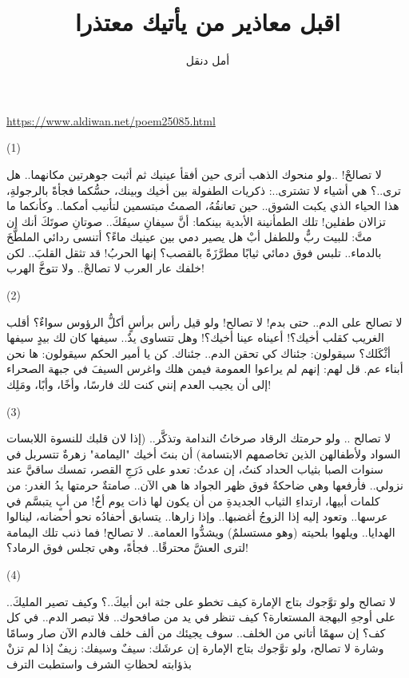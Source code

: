 \documentclass{article}
\title{اقبل معاذير من يأتيك معتذرا}
\author{\textarabic{أمل دنقل}}
\date{}
\begin{document}
\centering

\maketitle

\textenglish{\href{https://www.aldiwan.net/poem25085.html}{https://www.aldiwan.net/poem25085.html}}

\begin{modernpoem*}
(1)

لا تصالحْ!
..ولو منحوك الذهب
أترى حين أفقأ عينيك
ثم أثبت جوهرتين مكانهما..
هل ترى..؟
هي أشياء لا تشترى..:
ذكريات الطفولة بين أخيك وبينك،
حسُّكما فجأةً بالرجولةِ،
هذا الحياء الذي يكبت الشوق.. حين تعانقُهُ،
الصمتُ مبتسمين لتأنيب أمكما.. وكأنكما
ما تزالان طفلين!
تلك الطمأنينة الأبدية بينكما:
أنَّ سيفانِ سيفَكَ..
صوتانِ صوتَكَ
أنك إن متَّ:
للبيت ربٌّ
وللطفل أبْ
هل يصير دمي بين عينيك ماءً؟
أتنسى ردائي الملطَّخَ بالدماء..
تلبس فوق دمائي ثيابًا مطرَّزَةً بالقصب؟
إنها الحربُ!
قد تثقل القلبَ..
لكن خلفك عار العرب
لا تصالحْ..
ولا تتوخَّ الهرب!

(2)

لا تصالح على الدم.. حتى بدم!
لا تصالح! ولو قيل رأس برأسٍ
أكلُّ الرؤوس سواءٌ؟
أقلب الغريب كقلب أخيك؟!
أعيناه عينا أخيك؟!
وهل تتساوى يدٌ.. سيفها كان لك
بيدٍ سيفها أثْكَلك؟
سيقولون:
جئناك كي تحقن الدم..
جئناك. كن يا أمير الحكم
سيقولون:
ها نحن أبناء عم.
قل لهم: إنهم لم يراعوا العمومة فيمن هلك
واغرس السيفَ في جبهة الصحراء
إلى أن يجيب العدم
إنني كنت لك
فارسًا،
وأخًا،
وأبًا،
ومَلِك!

(3)

لا تصالح ..
ولو حرمتك الرقاد
صرخاتُ الندامة
وتذكَّر..
(إذا لان قلبك للنسوة اللابسات السواد ولأطفالهن الذين تخاصمهم الابتسامة)
أن بنتَ أخيك "اليمامة"
زهرةٌ تتسربل في سنوات الصبا
بثياب الحداد
كنتُ، إن عدتُ:
تعدو على دَرَجِ القصر،
تمسك ساقيَّ عند نزولي..
فأرفعها وهي ضاحكةٌ
فوق ظهر الجواد
ها هي الآن.. صامتةٌ
حرمتها يدُ الغدر:
من كلمات أبيها،
ارتداءِ الثياب الجديدةِ
من أن يكون لها ذات يوم أخٌ!
من أبٍ يتبسَّم في عرسها..
وتعود إليه إذا الزوجُ أغضبها..
وإذا زارها.. يتسابق أحفادُه نحو أحضانه،
لينالوا الهدايا..
ويلهوا بلحيته (وهو مستسلمٌ)
ويشدُّوا العمامة..
لا تصالح!
فما ذنب تلك اليمامة
لترى العشَّ محترقًا.. فجأةً،
وهي تجلس فوق الرماد؟!

(4)

لا تصالح
ولو توَّجوك بتاج الإمارة
كيف تخطو على جثة ابن أبيكَ..؟
وكيف تصير المليكَ..
على أوجهِ البهجة المستعارة؟
كيف تنظر في يد من صافحوك..
فلا تبصر الدم..
في كل كف؟
إن سهمًا أتاني من الخلف..
سوف يجيئك من ألف خلف
فالدم الآن صار وسامًا وشارة
لا تصالح،
ولو توَّجوك بتاج الإمارة
إن عرشَك: سيفٌ
وسيفك: زيفٌ
إذا لم تزنْ بذؤابته لحظاتِ الشرف
واستطبت الترف


\end{modernpoem*}
\end{document}
